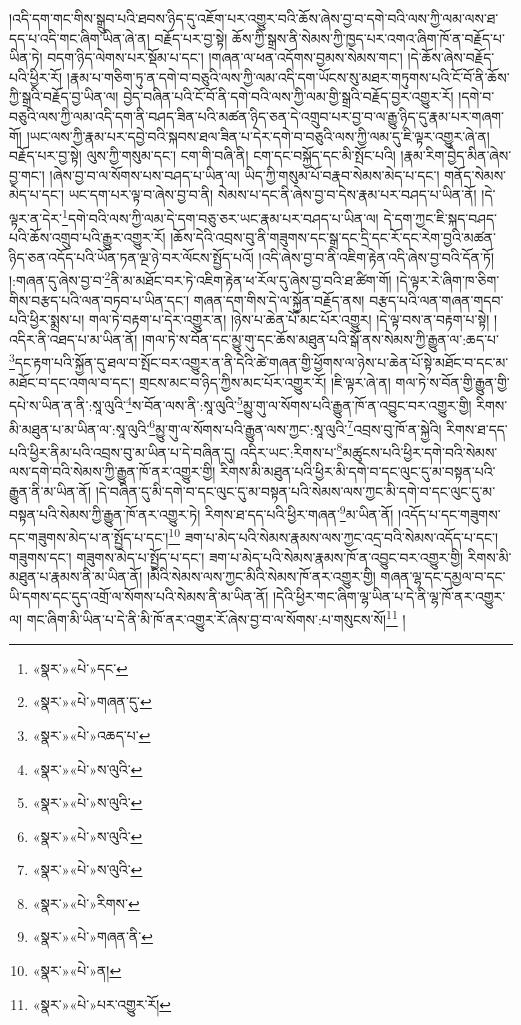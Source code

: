 །འདི་དག་གང་གིས་སྒྲུབ་པའི་ཐབས་ཉིད་དུ་འཇོག་པར་འགྱུར་བའི་ཆོས་ཞེས་བྱ་བ་དགེ་བའི་ལས་ཀྱི་ལམ་ལས་ཐ་དད་པ་འདི་གང་ཞིག་ཡིན་ཞེ་ན། བརྗོད་པར་བྱ་སྟེ། ཆོས་ཀྱི་སྒྲས་ནི་སེམས་ཀྱི་ཁྱད་པར་འགའ་ཞིག་ཁོ་ན་བརྗོད་པ་ཡིན་ཏེ། བདག་ཉིད་ལེགས་པར་སྡོམ་པ་དང་། །གཞན་ལ་ཕན་འདོགས་བྱམས་སེམས་གང་། །དེ་ཆོས་ཞེས་བརྗོད་པའི་ཕྱིར་རོ། །རྣམ་པ་གཅིག་ཏུ་ན་དགེ་བ་བཅུའི་ལས་ཀྱི་ལམ་འདི་དག་ཡོངས་སུ་མཐར་གཏུགས་པའི་ངོ་བོ་ནི་ཆོས་ཀྱི་སྒྲའི་བརྗོད་བྱ་ཡིན་ལ། བྱེད་བཞིན་པའི་ངོ་བོ་ནི་དགེ་བའི་ལས་ཀྱི་ལམ་གྱི་སྒྲའི་བརྗོད་བྱར་འགྱུར་རོ། །དགེ་བ་བཅུའི་ལས་ཀྱི་ལམ་འདི་དག་ནི་བཤད་ཟིན་པའི་མཚན་ཉིད་ཅན་དེ་འགྲུབ་པར་བྱ་བ་ལ་རྒྱུ་ཉིད་དུ་རྣམ་པར་གཞག་གོ། །ཡང་ལས་ཀྱི་རྣམ་པར་དབྱེ་བའི་སྐབས་ཐལ་ཟིན་པ་དེར་དགེ་བ་བཅུའི་ལས་ཀྱི་ལམ་དུ་ཇི་ལྟར་འགྱུར་ཞེ་ན། བརྗོད་པར་བྱ་སྟེ། ལུས་ཀྱི་གསུམ་དང་། ངག་གི་བཞི་ནི། ངག་དང་བསྐྱོད་དང་མི་སྤོང་པའི། །རྣམ་རིག་བྱེད་མིན་ཞེས་བྱ་གང་། །ཞེས་བྱ་བ་ལ་སོགས་པས་བཤད་པ་ཡིན་ལ། ཡིད་ཀྱི་གསུམ་པོ་བརྣབ་སེམས་མེད་པ་དང་། གནོད་སེམས་མེད་པ་དང་། ཡང་དག་པར་ལྟ་བ་ཞེས་བྱ་བ་ནི། སེམས་པ་དང་ནི་ཞེས་བྱ་བ་དེས་རྣམ་པར་བཤད་པ་ཡིན་ནོ། །དེ་ལྟར་ན་དེར་\footnote{«སྣར་»«པེ་»དང་}དགེ་བའི་ལས་ཀྱི་ལམ་དེ་དག་བཅུ་ཅར་ཡང་རྣམ་པར་བཤད་པ་ཡིན་ལ། དེ་དག་ཀྱང་ཇི་སྐད་བཤད་པའི་ཆོས་འགྲུབ་པའི་རྒྱུར་འགྱུར་རོ། །ཆོས་དེའི་འབྲས་བུ་ནི་གཟུགས་དང་སྒྲ་དང་དྲི་དང་རོ་དང་རེག་བྱའི་མཚན་ཉིད་ཅན་འདོད་པའི་ཡོན་ཏན་ལྔ་ཉེ་བར་ལོངས་སྤྱོད་པའོ། །འདི་ཞེས་བྱ་བ་ནི་འཇིག་རྟེན་འདི་ཞེས་བྱ་བའི་དོན་ཏོ། །:གཞན་དུ་ཞེས་བྱ་བ་\footnote{«སྣར་»«པེ་»གཞན་དུ་}ནི་མ་མཐོང་བར་ཏེ་འཇིག་རྟེན་ཕ་རོལ་དུ་ཞེས་བྱ་བའི་ཐ་ཚིག་གོ། །དེ་ལྟར་རེ་ཞིག་ཁ་ཅིག་གིས་བརྩད་པའི་ལན་བཏབ་པ་ཡིན་དང་། གཞན་དག་གིས་དེ་ལ་སྐྱོན་བརྗོད་ནས། བརྩད་པའི་ལན་གཞན་གདབ་པའི་ཕྱིར་སྨྲས་པ། གལ་ཏེ་བརྟག་པ་དེར་འགྱུར་ན། །ཉེས་པ་ཆེན་པོ་མང་པོར་འགྱུར། །དེ་ལྟ་བས་ན་བརྟག་པ་སྟེ། །འདིར་ནི་འཐད་པ་མ་ཡིན་ནོ། །གལ་ཏེ་ས་བོན་དང་མྱུ་གུ་དང་ཆོས་མཐུན་པའི་སྒོ་ནས་སེམས་ཀྱི་རྒྱུན་ལ་:ཆད་པ་\footnote{«སྣར་»«པེ་»འཆད་པ་}དང་རྟག་པའི་སྐྱོན་དུ་ཐལ་བ་སྤོང་བར་འགྱུར་ན་ནི་དེའི་ཚེ་གཞན་གྱི་ཕྱོགས་ལ་ཉེས་པ་ཆེན་པོ་སྟེ་མཐོང་བ་དང་མ་མཐོང་བ་དང་འགལ་བ་དང་། གྲངས་མང་བ་ཉིད་ཀྱིས་མང་པོར་འགྱུར་རོ། །ཇི་ལྟར་ཞེ་ན། གལ་ཏེ་ས་བོན་གྱི་རྒྱུན་གྱི་དཔེ་ས་ཡིན་ན་ནི་:སཱ་ལུའི་\footnote{«སྣར་»«པེ་»ས་ལུའི་}ས་བོན་ལས་ནི་:སཱ་ལུའི་\footnote{«སྣར་»«པེ་»ས་ལུའི་}མྱུ་གུ་ལ་སོགས་པའི་རྒྱུན་ཁོ་ན་འབྱུང་བར་འགྱུར་གྱི། རིགས་མི་མཐུན་པ་མ་ཡིན་ལ་:སཱ་ལུའི་\footnote{«སྣར་»«པེ་»ས་ལུའི་}མྱུ་གུ་ལ་སོགས་པའི་རྒྱུན་ལས་ཀྱང་:སཱ་ལུའི་\footnote{«སྣར་»«པེ་»ས་ལུའི་}འབྲས་བུ་ཁོ་ན་སྐྱེའི། རིགས་ཐ་དད་པའི་ཕྱིར་ནིམ་པའི་འབྲས་བུ་མ་ཡིན་པ་དེ་བཞིན་དུ། འདིར་ཡང་:རིགས་པ་\footnote{«སྣར་»«པེ་»རིགས་}མཚུངས་པའི་ཕྱིར་དགེ་བའི་སེམས་ལས་དགེ་བའི་སེམས་ཀྱི་རྒྱུན་ཁོ་ནར་འགྱུར་གྱི། རིགས་མི་མཐུན་པའི་ཕྱིར་མི་དགེ་བ་དང་ལུང་དུ་མ་བསྟན་པའི་རྒྱུན་ནི་མ་ཡིན་ནོ། །དེ་བཞིན་དུ་མི་དགེ་བ་དང་ལུང་དུ་མ་བསྟན་པའི་སེམས་ལས་ཀྱང་མི་དགེ་བ་དང་ལུང་དུ་མ་བསྟན་པའི་སེམས་ཀྱི་རྒྱུན་ཁོ་ནར་འགྱུར་ཏེ། རིགས་ཐ་དད་པའི་ཕྱིར་གཞན་\footnote{«སྣར་»«པེ་»གཞན་ནི་}མ་ཡིན་ནོ། །འདོད་པ་དང་གཟུགས་དང་གཟུགས་མེད་པ་ན་སྤྱོད་པ་དང་།\footnote{«སྣར་»«པེ་»ན།} ཟག་པ་མེད་པའི་སེམས་རྣམས་ལས་ཀྱང་འདྲ་བའི་སེམས་འདོད་པ་དང་། གཟུགས་དང་། གཟུགས་མེད་པ་སྤྱོད་པ་དང་། ཟག་པ་མེད་པའི་སེམས་རྣམས་ཁོ་ན་འབྱུང་བར་འགྱུར་གྱི། རིགས་མི་མཐུན་པ་རྣམས་ནི་མ་ཡིན་ནོ། །མིའི་སེམས་ལས་ཀྱང་མིའི་སེམས་ཁོ་ནར་འགྱུར་གྱི། གཞན་ལྷ་དང་དམྱལ་བ་དང་ཡི་དགས་དང་དུད་འགྲོ་ལ་སོགས་པའི་སེམས་ནི་མ་ཡིན་ནོ། །དེའི་ཕྱིར་གང་ཞིག་ལྷ་ཡིན་པ་དེ་ནི་ལྷ་ཁོ་ནར་འགྱུར་ལ། གང་ཞིག་མི་ཡིན་པ་དེ་ནི་མི་ཁོ་ནར་འགྱུར་རོ་ཞེས་བྱ་བ་ལ་སོགས་:པ་གསུངས་སོ།\footnote{«སྣར་»«པེ་»པར་འགྱུར་རོ།} །
